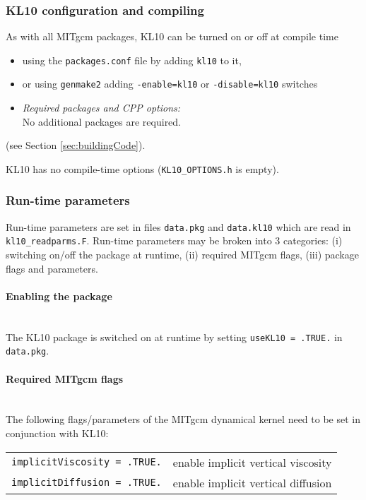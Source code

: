 \subsubsection{KL10 configuration and compiling
\label{sec:pkg:kl10:comp}}

As with all MITgcm packages, KL10 can be turned on or off at compile time
%
\begin{itemize}
%
\item
using the \texttt{packages.conf} file by adding \texttt{kl10} to it,
%
\item
or using \texttt{genmake2} adding
\texttt{-enable=kl10} or \texttt{-disable=kl10} switches
%
\item
\textit{Required packages and CPP options:} \\
No additional packages are required.
%
\end{itemize}
(see Section \ref{sec:buildingCode}).

KL10 has no compile-time options (\texttt{KL10\_OPTIONS.h} is empty).

\subsubsection{Run-time parameters
\label{sec:pkg:kl10:runtime}}

Run-time parameters are set in files
\texttt{data.pkg} and \texttt{data.kl10}
which are read in \texttt{kl10\_readparms.F}.
Run-time parameters may be broken into 3 categories:
(i) switching on/off the package at runtime,
(ii) required MITgcm flags,
(iii) package flags and parameters.

\paragraph{Enabling the package}
~ \\
%
The KL10 package is switched on at runtime by setting
\texttt{useKL10 = .TRUE.} in \texttt{data.pkg}.

\paragraph{Required MITgcm flags}
~ \\
%
The following flags/parameters of the MITgcm dynamical
kernel need to be set in conjunction with KL10:

\begin{tabular}{ll}
\texttt{implicitViscosity = .TRUE.} & enable implicit vertical viscosity \\
\texttt{implicitDiffusion = .TRUE.} & enable implicit vertical diffusion \\
\end{tabular}

